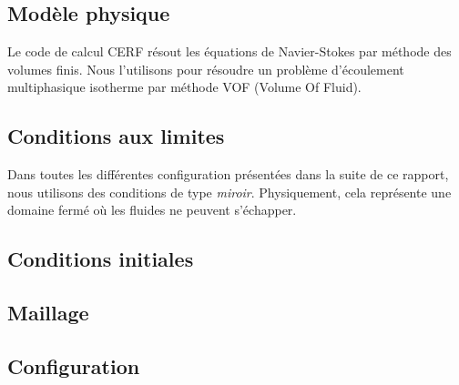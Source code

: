\documentclass[../main.tex]{subfiles}
\begin{document}
\subsection{Modèle physique}

Le code de calcul CERF résout les équations de Navier-Stokes par méthode des volumes finis.
Nous l'utilisons pour résoudre un problème d'écoulement multiphasique isotherme par méthode VOF (Volume Of Fluid).



\subsection{Conditions aux limites}

Dans toutes les différentes configuration présentées dans la suite de ce rapport, nous utilisons des conditions de type \textit{miroir}.
Physiquement, cela représente une domaine fermé où les fluides ne peuvent s'échapper.





\subsection{Conditions initiales}









\subsection{Maillage}





\subsection{Configuration}
\end{document}
